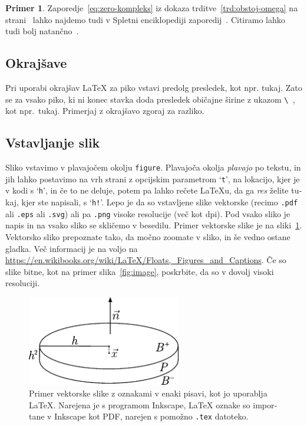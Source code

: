 \documentclass[12pt,a4paper,twoside]{article}
\theoremstyle{definition} %
\newtheorem{primer}[definicija]{Primer}
\theoremstyle{plain} %
\numberwithin{equation}{section}  %
\begin{document}
\begin{otherlanguage}{slovene}
\begin{primer}
  Zaporedje~\eqref{eq:zero-kompleks} iz dokaza trditve~\ref{trd:obstoj-omega} na
  strani~\pageref{trd:obstoj-omega} lahko najdemo tudi v Spletni enciklopediji zaporedij~\cite{oeis}.
  Citiramo lahko tudi bolj natančno~\cite[trditev 2.1, str.\ 23]{lebedev2009introduction}.
\end{primer}

\subsection{Okrajšave}
Pri uporabi okrajšav \LaTeX{} za piko vstavi predolg presledek, kot npr. tukaj. Zato se za vsako
piko, ki ni konec stavka doda presledek običajne širine z ukazom \verb*|\ |, kot npr.\ tukaj.
Primerjaj z okrajšavo zgoraj za razliko.

\subsection{Vstavljanje slik}
Sliko vstavimo v plavajočem okolju \texttt{figure}. Plavajoča okolja \emph{plavajo} po tekstu, in
jih lahko postavimo na vrh strani z opcijskim parametrom `\texttt{t}', na lokacijo, kjer je v kodi s
`\texttt{h}', in če to ne deluje, potem pa lahko rečete \LaTeX u, da ga \emph{res} želite tukaj,
kjer ste napisali, s `\texttt{h!}'. Lepo je da so vstavljene slike vektorske (recimo \texttt{.pdf}
ali \texttt{.eps} ali \texttt{.svg}) ali pa \texttt{.png} visoke resolucije (več kot
\unit[300]{dpi}).  Pod vsako sliko je napis in na vsako sliko se skličemo v besedilu. Primer
vektorske slike je na sliki~\ref{fig:sample}. Vektorsko sliko prepoznate tako, da močno
zoomate v sliko, in še vedno ostane gladka. Več informacij je na voljo na
\url{https://en.wikibooks.org/wiki/LaTeX/Floats,_Figures_and_Captions}. Če so slike bitne, kot na
primer slika~\ref{fig:image}, poskrbite, da so v dovolj visoki resoluciji.

\begin{figure}[h]
  \centering
  \includegraphics[width=0.6\textwidth]{images/sample.pdf}
  \caption[Primer vektorske slike.]{Primer vektorske slike z oznakami v enaki pisavi, kot jo
     uporablja \LaTeX{}.  Narejena je s programom Inkscape, \LaTeX{} oznake so importane v
     Inkscape kot PDF, narejen s pomožno \texttt{.tex} datoteko.}
  \label{fig:sample}
\end{figure}


\end{otherlanguage}
\end{document}
